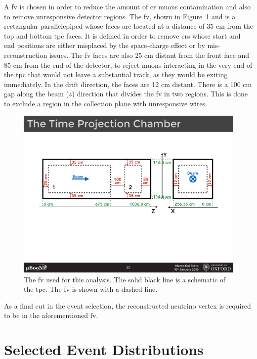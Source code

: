 A \acrshort{fv} is chosen in order to reduce the amount of  \acrshort{cr} muons contamination and also to remove unresponsive detector regions. The \acrshort{fv}, shown in Figure~\ref{fig:fiducial_volume} and is a rectangular parallelepiped whose faces are located at a distance of 35 cm from the top and bottom \acrshort{tpc} faces. It is defined in order to remove \acrshort{cr}s whose start and end positions are either misplaced by the space-charge effect or by mis-reconstruction issues. The \acrshort{fv} faces are also 25 cm distant from the front face and 85 cm from the end of the detector, to reject muons interacting in the very end of the \acrshort{tpc} that would not leave a substantial track, as they would be exiting immediately. In the drift direction, the faces are 12 cm distant. There is a 100 cm gap along the beam ($z$) direction that divides the \acrshort{fv} in two regions. This is done to exclude a region in the collection plane with unresponsive wires.

\begin{figure}[t]
\centering
\includegraphics[width=.95\textwidth]{images/fiducial_volume}
\caption[Fiducial Volume]{The \acrshort{fv} used for this analysis. The solid black line is a schematic of the \acrshort{tpc}. The \acrshort{fv} is shown with a dashed line.}
\label{fig:fiducial_volume}
\end{figure}

As a final cut in the event selection, the reconstructed neutrino vertex is required to be in the aforementioned \acrshort{fv}.



\section{Selected Event Distributions}
\label{sec:event_distributions}

